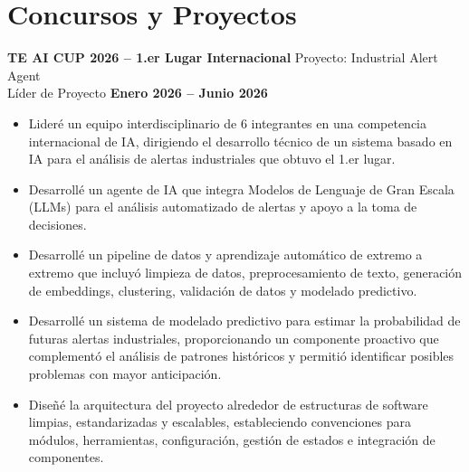 \documentclass[11pt]{article}
\begin{document}
\section*{Concursos y Proyectos}
\textbf{TE AI CUP 2026 -- 1.er Lugar Internacional} \hfill Proyecto: Industrial Alert Agent\\
Líder de Proyecto \hfill \textbf{Enero 2026 -- Junio 2026}
\vspace{-0.3cm}
\begin{itemize}[leftmargin=*]
    \item Lideré un equipo interdisciplinario de 6 integrantes en una competencia internacional de IA, dirigiendo el desarrollo técnico de un sistema basado en IA para el análisis de alertas industriales que obtuvo el 1.er lugar. 

    \vspace{-0.3cm} 
    \item Desarrollé un agente de IA que integra Modelos de Lenguaje de Gran Escala (LLMs) para el análisis automatizado de alertas y apoyo a la toma de decisiones.

    \vspace{-0.3cm} 
    \item Desarrollé un pipeline de datos y aprendizaje automático de extremo a extremo que incluyó limpieza de datos, preprocesamiento de texto, generación de embeddings, clustering, validación de datos y modelado predictivo. 

    \vspace{-0.3cm}
    \item Desarrollé un sistema de modelado predictivo para estimar la probabilidad de futuras alertas industriales, proporcionando un componente proactivo que complementó el análisis de patrones históricos y permitió identificar posibles problemas con mayor anticipación.

    \vspace{-0.3cm} 
    \item Diseñé la arquitectura del proyecto alrededor de estructuras de software limpias, estandarizadas y escalables, estableciendo convenciones para módulos, herramientas, configuración, gestión de estados e integración de componentes. 
\end{itemize}
\end{document}
